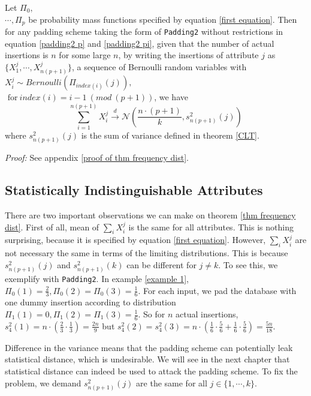 \begin{theorem} \label{thm frequency dist}
Let $\Pi_0,$ \\ $\cdots, \Pi_p$ be probability mass functions specified by equation \ref{first equation}. Then for any padding scheme taking the form of \texttt{Padding2} without restrictions in equation \ref{padding2 p} and \ref{padding2 pi}, given that the number of actual insertions is $n$ for some large $n$, by writing the insertions of attribute $j$ as $\{X_1^j, \cdots, X_{n(p+1)}^j\}$, a sequence of Bernoulli random variables with $X_i^j \sim Bernoulli(\Pi_{index(i)}(j)),$ \\$ \text{ for} \ index(i) = i - 1 \ (mod \ (p+1))$, we have
\begin{equation}
	\sum_{i=1}^{n(p+1)} X_i^j \xrightarrow[]{d} \mathcal{N}(\frac{n \cdot (p+1)}{k}, s_{n(p+1)}^2(j)) \label{frequency dist}
\end{equation}
where $s_{n(p+1)}^2(j)$ is the sum of variance defined in theorem \ref{CLT}.
\end{theorem} 

\textit{Proof: } See appendix \ref{proof of thm frequency dist}.




\subsection{Statistically Indistinguishable Attributes}
There are two important observations we can make on theorem \ref{thm frequency dist}. First of all, mean of $\sum_{i} X_i^j$ is the same for all attributes. This is nothing surprising, because it is specified by equation \ref{first equation}. However, $\sum_{i} X_i^j$ are not necessary the same in terms of the limiting distributions. This is because $s_{n(p+1)}^2(j)$ and $s_{n(p+1)}^2(k)$ can be different for $j \neq k$. To see this, we exemplify with \texttt{Padding2}. In example \ref{example 1}, $\Pi_0(1) = \frac{2}{3}, \Pi_0(2) = \Pi_0(3) = \frac{1}{6}$. For each input, we pad the database with one dummy insertion according to distribution $\Pi_1(1) = 0, \Pi_1(2) = \Pi_1(3) = \frac{1}{6}$. So for $n$ actual insertions, $s_4^2(1) = n \cdot (\frac{2}{3} \cdot \frac{1}{3}) = \frac{2n}{9}$ but $s_4^2(2) = s_4^2(3) = n \cdot (\frac{1}{6} \cdot \frac{5}{6} + \frac{1}{6} \cdot \frac{5}{6}) = \frac{5n}{18}$.

Difference in the variance means that the padding scheme can potentially leak statistical distance, which is undesirable. We will see in the next chapter that statistical distance can indeed be used to attack the padding scheme. To fix the problem, we demand $s_{n(p+1)}^2(j)$ are the same for all $j \in \{1, \cdots, k\}$.

